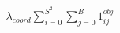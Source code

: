\documentclass[preview]{standalone}
\begin{document}
\begin{align*}
\lambda_{coord}\sum_{i=0}^{S^{2}}\sum_{j=0}^{B}1_{ij}^{obj}
\end{align*}
\end{document}
